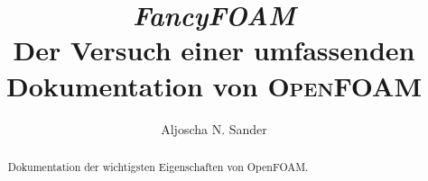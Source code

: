 
%
\usepackage{hyperref, wasysym}
\usepackage{todonotes}
%

\title{\textit{FancyFOAM}\\Der Versuch einer umfassenden Dokumentation von \textsc{OpenFOAM}}

\author{Aljoscha N. Sander}






\maketitle

\clearpage                     %

\ofoot[\pagemark]{\pagemark}   %

\tableofcontents               %

\listoffigures                 %

\listoftables                  %

\lstlistoflistings             %





\clearpage                     %

\begin{abstract}
Dokumentation der wichtigsten Eigenschaften von OpenFOAM. 
\end{abstract}

